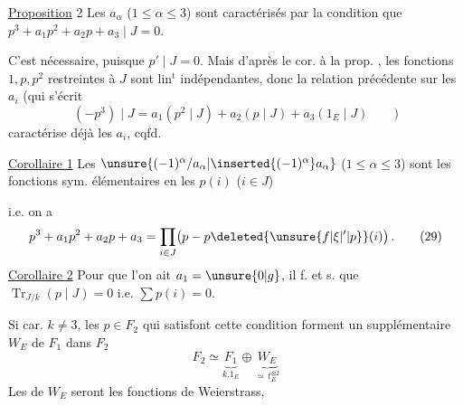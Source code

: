 \uline{Proposition} 2 Les $a_\alpha$ ($1\leq\alpha\leq3$) sont caractérisés par la condition que $p^3+a_1p^2+a_2p+a_3\mid J=0$.

C'est nécessaire, puisque $p'\mid J=0$. Mais d'après le cor. à la prop. , les fonctions $1,p,p^2$ restreintes à $J$ sont lin$^{\mathrm t}$ indépendantes, donc la relation précédente sur les $a_i$ (qui s'écrit
\[
 (-p^3)\mid J=a_1(p^2\mid J)+a_2(p\mid J)+a_3(1_E\mid J)\qquad)
\]
caractérise déjà les $a_i$, cqfd.

\uline{Corollaire 1} Les $\unsure{(-1)^\alpha/a_\alpha|\inserted{(-1)^\alpha}a_\alpha}$ ($1\leq\alpha\leq3$) sont les fonctions sym. élémentaires en les $p(i)$ ($i\in J$)

i.e. on a
\[
 p^3+a_1p^2+a_2p+a_3=\prod_{i\in J}\bigl(p-p\deleted{\unsure{f|\xi|'|p}}(i)\bigr)\,. \tag*{(29)}
\]
\uline{Corollaire 2} Pour que l'on ait $a_1=\unsure{0|g}$, il f. et s. que $\operatorname{Tr}_{J/k}(p\mid J)=0$ i.e. $\sum p(i)=0$.

Si car. $k\ne3$, les $p\in F_2$ qui satisfont cette condition forment un supplémentaire $W_E$ de $F_1$ dans $F_2$
\[
 F_2\simeq\underbrace{F_1}_{k.1_E}\oplus\underbrace{W_E}_{\simeq\, t_E^{\otimes2}} \tag*{(30)}
\]
Les   de $W_E$ seront  les fonctions de Weierstrass,
